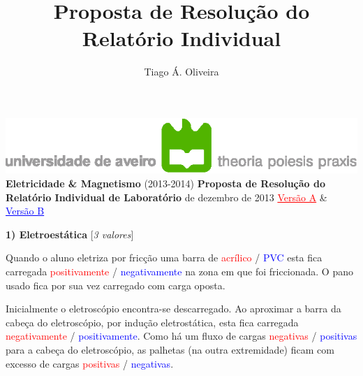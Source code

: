 \documentclass[11pt,a4paper,final]{article}
\author{Tiago \'{A}. Oliveira}
\title{Proposta de Resolu\c{c}\~{a}o do Relat\'{o}rio Individual}
\begin{document}
\begin{center}
\includegraphics[scale=1]{logo_UA}
\linebreak\linebreak
\LARGE\textbf{Eletricidade \& Magnetismo}
\normalsize\linebreak
(2013-2014)
\linebreak\linebreak
\textbf{Proposta de Resolu\c{c}\~{a}o do Relat\'{o}rio Individual de Laborat\'{o}rio}
 de dezembro de 2013
\linebreak\linebreak
\textcolor{red}{\underline{Vers\~{a}o A}} \& \textcolor{blue}{\underline{Vers\~{a}o B}}
\end{center}

\noindent\textbf{1) Eletroest\'{a}tica} \hfill [\textit{3 valores}]

Quando o aluno eletriza por fric\c{c}\~{a}o uma barra de \textcolor{red}{acr\'{i}lico} / \textcolor{blue}{PVC} esta fica carregada \textcolor{red}{positivamente} / \textcolor{blue}{negativamente} na zona em que foi friccionada. O pano usado fica por sua vez carregado com carga oposta.

Inicialmente o eletrosc\'{o}pio encontra-se descarregado. Ao aproximar a barra da cabe\c{c}a do eletrosc\'{o}pio, por indu\c{c}\~{a}o eletrost\'{a}tica, esta fica carregada \textcolor{red}{negativamente} / \textcolor{blue}{positivamente}. Como h\'{a} um fluxo de cargas \textcolor{red}{negativas} / \textcolor{blue}{positivas} para a cabe\c{c}a do eletrosc\'{o}pio, as palhetas (na outra extremidade) ficam com excesso de cargas \textcolor{red}{positivas} / \textcolor{blue}{negativas}.
\end{document}
